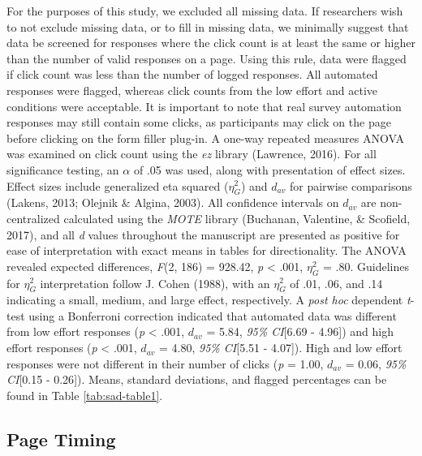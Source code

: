\documentclass[english,man]{apa6}
\theoremstyle{definition}
\theoremstyle{definition}
\theoremstyle{definition}
\theoremstyle{remark}
\begin{document}
For the purposes of this study, we excluded all missing data. If
researchers wish to not exclude missing data, or to fill in missing
data, we minimally suggest that data be screened for responses where the
click count is at least the same or higher than the number of valid
responses on a page. Using this rule, data were flagged if click count
was less than the number of logged responses. All automated responses
were flagged, whereas click counts from the low effort and active
conditions were acceptable. It is important to note that real survey
automation responses may still contain some clicks, as participants may
click on the page before clicking on the form filler plug-in. A one-way
repeated measures ANOVA was examined on click count using the \emph{ez}
library (Lawrence, 2016). For all significance testing, an \(\alpha\) of
.05 was used, along with presentation of effect sizes. Effect sizes
include generalized eta squared (\(\eta_G^2\)) and \(d_{av}\) for
pairwise comparisons (Lakens, 2013; Olejnik \& Algina, 2003). All
confidence intervals on \(d_{av}\) are non-centralized calculated using
the \emph{MOTE} library (Buchanan, Valentine, \& Scofield, 2017), and
all \emph{d} values throughout the manuscript are presented as positive
for ease of interpretation with exact means in tables for
directionality. The ANOVA revealed expected differences, \emph{F}(2,
186) = 928.42, \emph{p} \textless{} .001, \(\eta_G^2\) = .80. Guidelines
for \(\eta_G^2\) interpretation follow J. Cohen (1988), with an
\(\eta_G^2\) of .01, .06, and .14 indicating a small, medium, and large
effect, respectively. A \emph{post hoc} dependent \emph{t}-test using a
Bonferroni correction indicated that automated data was different from
low effort responses (\emph{p} \textless{} .001, \(d_{av}\) = 5.84,
\emph{95\% CI}{[}6.69 - 4.96{]}) and high effort responses (\emph{p}
\textless{} .001, \(d_{av}\) = 4.80, \emph{95\% CI}{[}5.51 - 4.07{]}).
High and low effort responses were not different in their number of
clicks (\emph{p} = 1.00, \(d_{av}\) = 0.06, \emph{95\% CI}{[}0.15 -
0.26{]}). Means, standard deviations, and flagged percentages can be
found in Table \ref{tab:sad-table1}.

\subsection{Page Timing}\label{page-timing-1}
\end{document}
